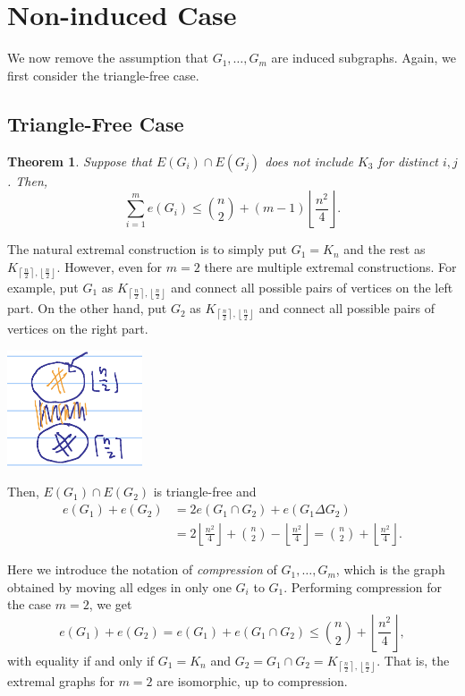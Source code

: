 \documentclass[a4paper]{article}
\newtheorem{theorem}{Theorem}[section]
\begin{document}
\section{Non-induced Case}

We now remove the assumption that $G_1, \dots, G_m$ are induced subgraphs. Again, we first consider
the triangle-free case.

\subsection{Triangle-Free Case}

\begin{theorem}
  Suppose that $E(G_i) \cap E(G_j)$ does not include $K_3$ for distinct $i, j$. Then,
  \[
    \sum_{i = 1}^m e(G_i) \leq \binom{n}{2} + (m - 1)\left\lfloor\frac{n^2}{4}\right\rfloor.
  \]
\end{theorem}

The natural extremal construction is to simply put $G_1 = K_n$ and the rest as
  $K_{\left\lceil\frac{n}{2}\right\rceil, \left\lfloor\frac{n}{2}\right\rfloor}$. However, even for
  $m = 2$ there are multiple extremal constructions. For example, put $G_1$ as
  $K_{\left\lceil\frac{n}{2}\right\rceil, \left\lfloor\frac{n}{2}\right\rfloor}$ and connect all
  possible pairs of vertices on the left part. On the other hand, put $G_2$ as
  $K_{\left\lceil\frac{n}{2}\right\rceil, \left\lfloor\frac{n}{2}\right\rfloor}$ and connect all
  possible pairs of vertices on the right part. 
  \begin{center}
    \includegraphics[width=0.3\textwidth]{non-induced-m2}
  \end{center}
  Then, $E(G_1) \cap E(G_2)$ is triangle-free and
  \begin{align*}
    e(G_1) + e(G_2) 
    &= 2e(G_1 \cap G_2) + e(G_1 \Delta G_2) \\
    &= 2\left\lfloor\frac{n^2}{4}\right\rfloor + \binom{n}{2} - \left\lfloor\frac{n^2}{4}\right\rfloor = \binom{n}{2} + \left\lfloor\frac{n^2}{4}\right\rfloor.
  \end{align*}

  Here we introduce the notation of \textit{compression} of $G_1, \ldots, G_m$, which is the graph
  obtained by moving all edges in only one $G_i$ to $G_1$. Performing compression for the case $m =
  2$, we get 
  \[
    e(G_1) + e(G_2) = e(G_1) + e(G_1 \cap G_2) \leq \binom{n}{2} + \left\lfloor\frac{n^2}{4}\right\rfloor,
  \]
  with equality if and only if $G_1 = K_n$ and $G_2 = G_1 \cap G_2 =
  K_{\left\lceil\frac{n}{2}\right\rceil, \left\lfloor\frac{n}{2}\right\rfloor}$. That is, the
  extremal graphs for $m = 2$ are isomorphic, up to compression.
\end{document}
